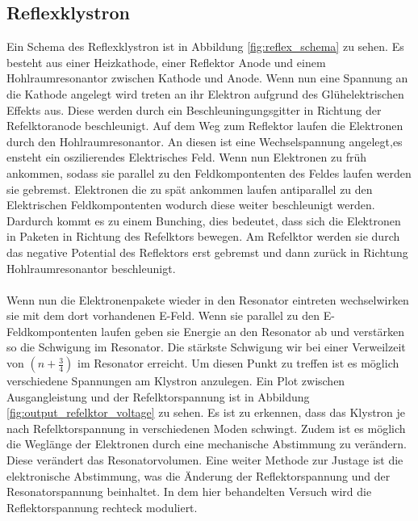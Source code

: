 \subsection{Reflexklystron}
Ein Schema des Reflexklystron ist in Abbildung \ref{fig:reflex_schema} zu sehen.
Es besteht aus einer Heizkathode, einer Reflektor Anode und einem Hohlraumresonantor zwischen Kathode und Anode.
Wenn nun eine Spannung an die Kathode angelegt wird treten an ihr Elektron aufgrund des Glühelektrischen Effekts aus.
Diese werden durch ein Beschleuningungsgitter in Richtung der Refelktoranode beschleunigt.
Auf dem Weg zum Reflektor laufen die Elektronen durch den Hohlraumresonantor.
An diesen ist eine Wechselspannung angelegt,es ensteht ein oszilierendes Elektrisches Feld.
Wenn nun Elektronen zu früh ankommen, sodass sie parallel zu den Feldkompontenten des Feldes laufen werden sie gebremst.
Elektronen die zu spät ankommen laufen antiparallel zu den Elektrischen Feldkompontenten wodurch diese weiter beschleunigt werden.
Dardurch kommt es zu einem Bunching, dies bedeutet, dass sich die Elektronen in Paketen in Richtung des Refelktors bewegen.
Am Refelktor werden sie durch das negative Potential des Reflektors erst gebremst und dann zurück in Richtung Hohlraumresonantor beschleunigt.
\\\\
Wenn nun die Elektronenpakete wieder in den Resonator eintreten wechselwirken sie mit dem dort vorhandenen E-Feld.
Wenn sie parallel zu den E-Feldkompontenten laufen geben sie Energie an den Resonator ab und verstärken so die Schwigung im Resonator.
Die stärkste Schwigung wir bei einer Verweilzeit von $(n + \frac{3}{4})$ im Resonator erreicht.
Um diesen Punkt zu treffen ist es möglich verschiedene Spannungen am Klystron anzulegen.
Ein Plot zwischen Ausgangleistung und der Refelktorspannung ist in Abbildung \ref{fig:output_refelktor_voltage} zu sehen.
Es ist zu erkennen, dass das Klystron je nach Refelktorspannung in verschiedenen Moden schwingt.
Zudem ist es möglich die Weglänge der Elektronen durch eine mechanische Abstimmung zu verändern.
Diese verändert das Resonatorvolumen.
Eine weiter Methode zur Justage ist die elektronische Abstimmung, was die Änderung der Reflektorspannung und der Resonatorspannung beinhaltet.
In dem hier behandelten Versuch wird die Reflektorspannung rechteck moduliert.
\\\\
